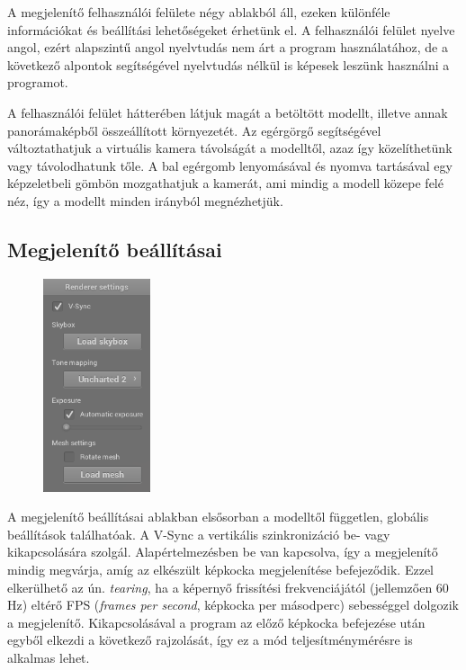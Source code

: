 
A megjelenítő felhasználói felülete négy ablakból áll, ezeken különféle információkat és beállítási lehetőségeket érhetünk el. A felhasználói felület nyelve angol, ezért alapszintű angol nyelvtudás nem árt a program használatához, de a következő alpontok segítségével nyelvtudás nélkül is képesek leszünk használni a programot.

A felhasználói felület hátterében látjuk magát a betöltött modellt, illetve annak panorámaképből összeállított környezetét. Az egérgörgő segítségével változtathatjuk a virtuális kamera távolságát a modelltől, azaz így közelíthetünk vagy távolodhatunk tőle. A bal egérgomb lenyomásával és nyomva tartásával egy képzeletbeli gömbön mozgathatjuk a kamerát, ami mindig a modell közepe felé néz, így a modellt minden irányból megnézhetjük.

\subsection{Megjelenítő beállításai}

\begin{figure}
    \vspace{-23pt}
    \includegraphics[width=0.28\textwidth]{images/renderer_settings.png}
    \vspace{-20pt}
\end{figure}

A megjelenítő beállításai ablakban elsősorban a modelltől független, globális beállítások találhatóak. A V-Sync a vertikális szinkronizáció be- vagy kikapcsolására szolgál. Alapértelmezésben be van kapcsolva, így a megjelenítő mindig megvárja, amíg az elkészült képkocka megjelenítése befejeződik. Ezzel elkerülhető az ún. \textit{tearing}, ha a képernyő frissítési frekvenciájától (jellemzően 60 Hz) eltérő FPS (\textit{frames per second}, képkocka per másodperc) sebességgel dolgozik a megjelenítő. Kikapcsolásával a program az előző képkocka befejezése után egyből elkezdi a következő rajzolását, így ez a mód teljesítménymérésre is alkalmas lehet.

